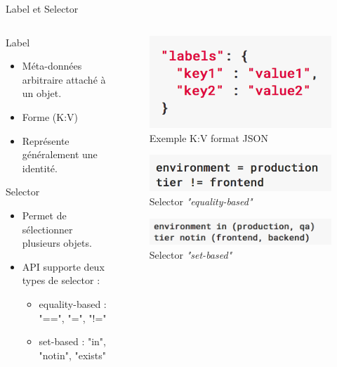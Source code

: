 \documentclass{bredelebeamer}
\begin{document}
\begin{frame}{Label et Selector}
\begin{columns}
\begin{column}{0.5\textwidth}
\begin{block}{Label}
\begin{itemize}
\item Méta-données arbitraire attaché à un objet.
\item Forme (K:V)
\item Représente généralement une identité.
\end{itemize}
\end{block}
\begin{block}{Selector}
\begin{itemize}
\item Permet de sélectionner plusieurs objets.
\item API supporte deux types de selector : 
\begin{itemize}
\item equality-based : "==", "=", "!=" %
\item set-based : "in", "notin", "exists"
\end{itemize}
\end{itemize}
\end{block}
\end{column}
\begin{column}{0.5\textwidth}
\begin{figure}
\centering
\includegraphics[scale=0.4]{images/img9.png}
\caption{Exemple K:V format JSON}
\end{figure}
\begin{figure}
\centering
\includegraphics[scale=0.4]{images/img11.png}
\caption{Selector \textit{"equality-based"}}
\end{figure}
\begin{figure}
\centering
\includegraphics[scale=0.4]{images/img10.png}
\caption{Selector \textit{"set-based"}}
\end{figure}
\end{column}
\end{columns}
\end{frame}
\end{document}
